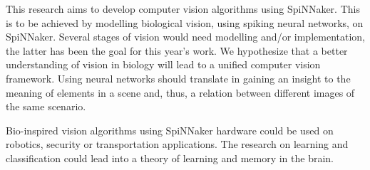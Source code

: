 This research aims to develop computer vision algorithms using SpiNNaker. This 
is to be achieved by modelling biological vision, using spiking neural networks,
on SpiNNaker. Several stages of vision would need modelling and/or 
implementation, the latter has been the goal for this year's work.
We hypothesize that a better understanding of vision in biology will lead to 
a unified computer vision framework. Using neural networks should translate in 
gaining an insight to the meaning of elements in a scene and, thus, a relation
between different images of the same scenario.

Bio-inspired vision algorithms using SpiNNaker hardware could be used on 
robotics, security or transportation applications. The research on learning and 
classification could lead into a theory of learning and memory in the brain.